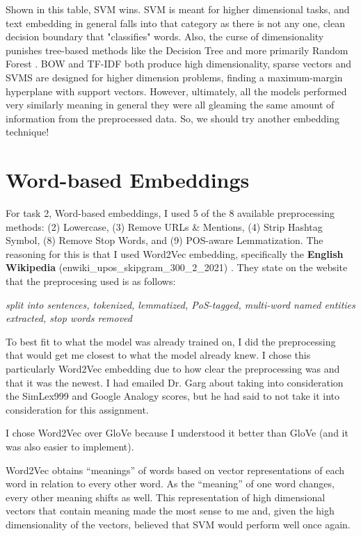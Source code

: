 \documentclass[12pt]{article}
\begin{document}
Shown in this table, SVM wins. SVM is meant for higher dimensional tasks, and text 
embedding in general falls into that category as there is not any one, clean decision boundary that 
"classifies" words. Also, the curse of dimensionality punishes tree-based methods like the Decision Tree 
and more primarily Random Forest \cite{SVMTextCat-Joachims}.
BOW and TF-IDF both produce high dimensionality, sparse vectors and SVMS are designed for higher dimension 
problems, finding a maximum-margin hyperplane with support vectors. \cite{redshift_svm_highdim} 
\cite{RFHighDim-Genuer}
However, ultimately, all the models performed very similarly meaning in general they were all gleaming 
the same amount of information from the preprocessed data. So, we should try another embedding technique!

\section{Word-based Embeddings} \label{word_embed}

For task 2, Word-based embeddings, I used 5 of the 8 available preprocessing methods: (2) Lowercase, 
(3) Remove URLs \& Mentions, (4) Strip Hashtag Symbol, (8) Remove Stop Words, and (9) POS-aware 
Lemmatization. The reasoning for this is that I used Word2Vec embedding, specifically the 
\textbf{English Wikipedia} (enwiki\_upos\_skipgram\_300\_2\_2021) \cite{fares-etal-2017-word}. 
They state on the website \cite{WebVectors-Fares2017} that the preprocesing used is as follows: 

\begin{center}
    \textit{split into sentences, tokenized, lemmatized, PoS-tagged, multi-word named entities extracted, 
    stop words removed}
\end{center}

To best fit to what the model was already trained on, I did the preprocessing that would get me closest 
to what the model already knew. I chose this particularly Word2Vec embedding due to how clear the preprocessing 
was and that it was the newest. I had emailed Dr. Garg about taking into consideration the 
SimLex999 and Google Analogy scores, but he had said to not take it into consideration for this 
assignment.

I chose Word2Vec over GloVe because I understood it better than GloVe (and it was also easier to implement).

Word2Vec obtains ``meanings'' of words based on vector representations of each word in relation to 
every other word. As the ``meaning'' of one word changes, every other meaning shifts as well. This representation 
of high dimensional vectors that contain meaning made the most sense to me and, given the high dimensionality 
of the vectors, believed that SVM would perform well once again. 
\end{document}
